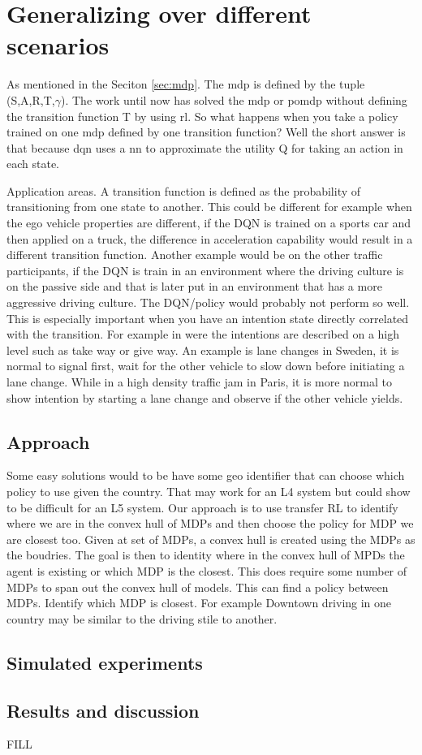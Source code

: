 \chapter{Generalizing over different scenarios}
As mentioned in the Seciton \ref{sec:mdp}. The \gls{mdp} is defined by the tuple (S,A,R,T,$\gamma$). The work until now has solved the \gls{mdp} or \gls{pomdp} without defining the transition function T by using \gls{rl}. So what happens when you take a policy trained on one \gls{mdp} defined by one transition function? Well the short answer is that because \gls{dqn} uses a \gls{nn} to approximate the utility Q for taking an action in each state. 

Application areas. A transition function is defined as the probability of transitioning from one state to another. This could be different for example when the ego vehicle properties are different, if the DQN is trained on a sports car and then applied on a truck, the difference in acceleration capability would result in a different transition function. Another example would be on the other traffic participants, if the DQN is train in an environment where the driving culture is on the passive side and that is later put in an environment that has a more aggressive driving culture. The DQN/policy would probably not perform so well. 
This is especially important when you have an intention state directly correlated with the transition. For example in \paperD were the intentions are described on a high level such as take way or give way. 
An example is lane changes in Sweden, it is normal to signal first, wait for the other vehicle to slow down before initiating a lane change. While in a high density traffic jam in Paris, it is more normal to show intention by starting a lane change and observe if the other vehicle yields. 

\section{Approach}
Some easy solutions would to be have some geo identifier that can choose which policy to use given the country. That may work for an L4 system but could show to be difficult for an L5 system. Our approach is to use transfer RL to identify where we are in the convex hull of MDPs and then choose the policy for MDP we are closest too. 
Given at set of MDPs, a convex hull is created using the MDPs as the boudries. The goal is then to identity where in the convex hull of MPDs the agent is existing or which MDP is the closest. 
This does require some number of MDPs to span out the convex hull of models. 
This can find a policy between MDPs. 
Identify which MDP is closest. For example Downtown driving in one country may be similar to the driving stile to another. 


\section{Simulated experiments}
\section{Results and discussion}
FILL